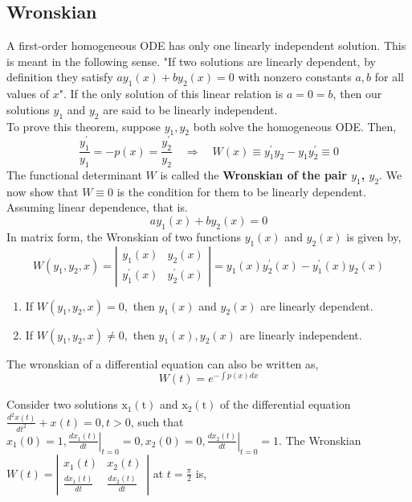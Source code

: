 \subsection{Wronskian}
A first-order homogeneous ODE has only one linearly independent solution. This is meant in the following sense. "If two solutions are linearly dependent, by definition they satisfy $a y_{1}(x)+b y_{2}(x)=0$ with nonzero constants $a, b$ for all values of $x$". If the only solution of this linear relation is $a=0=b$, then our solutions $y_{1}$ and $y_{2}$ are said to be linearly independent.
\\To prove this theorem, suppose $y_{1}, y_{2}$ both solve the homogeneous ODE. Then,
\begin{equation*}
\frac{y_{1}^{\prime}}{y_{1}}=-p(x)=\frac{y_{2}^{\prime}}{y_{2}} \quad \Rightarrow \quad W(x) \equiv y_{1}^{\prime} y_{2}-y_{1} y_{2}^{\prime} \equiv 0
\end{equation*}
The functional determinant $W$ is called the \textbf{Wronskian of the pair $y_{1}$, $y_{2}$}. We now show that $W \equiv 0$ is the condition for them to be linearly dependent. Assuming linear dependence, that is.
\begin{equation*}
a y_{1}(x)+b y_{2}(x)=0
\end{equation*}
In matrix form, the Wronskian of two functions $y_{1}(x)$ and $y_{2}(x)$ is given by,
\begin{equation}
W\left(y_{1}, y_{2}, x\right)=\left|\begin{array}{ll}
y_{1}(x) & y_{2}(x) \\
y_{1}^{\prime}(x) & y_{2}^{\prime}(x)
\end{array}\right|=y_{1}(x) y_{2}^{\prime}(x)-y_{1}^{\prime}(x) y_{2}(x)
\end{equation}
\begin{enumerate}
	\item If $W\left(y_{1}, y_{2}, x\right)=0,$ then $y_{1}(x)$ and $y_{2}(x)$ are linearly dependent.
	\item If $W\left(y_{1}, y_{2}, x\right) \neq 0,$ then $y_{1}(x), y_{2}(x)$ are linearly independent.
\end{enumerate}
\begin{note}
	The wronskian of a differential equation can also be written as,
	$$ W(t)=e^{-\int p(x)dx}$$
	\end{note}
\begin{exercise}
Consider two solutions $\mathrm{x}_{1}(\mathrm{t})$ and $\mathrm{x}_{2}(\mathrm{t})$ of the differential equation $\frac{d^{2} x(t)}{d t^{2}}+x(t)=0, t>0$, such that $x_{1}(0)=1,\left.\frac{d x_{1}(t)}{d t}\right|_{t=0}=0, x_{2}(0)=0,\left.\frac{d x_{2}(t)}{d t}\right|_{t=0}=1$. The Wronskian $W(t)=\left|\begin{array}{ll}x_{1}(t) & x_{2}(t) \\ \frac{d x_{1}(t)}{d t} & \frac{d x_{2}(t)}{d t}\end{array}\right|$ at $t=\frac{\pi}{2}$ is,	
\end{exercise}

